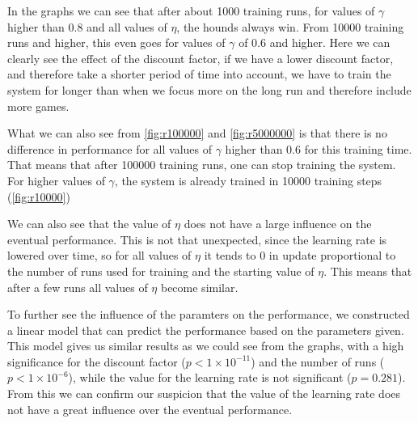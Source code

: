 In the graphs we can see that after about 1000 training runs, for values of
$\gamma$ higher than $0.8$ and all values of $\eta$, the hounds always win.
From 10000 training runs and higher, this even goes for values of $\gamma$
of $0.6$ and higher. Here we can clearly see the effect of the discount
factor, if we have a lower discount factor, and therefore take a shorter
period of time into account, we have to train the system for longer than
when we focus more on the long run and therefore include more games.

What we can also see from \autoref{fig:r100000} and \autoref{fig:r5000000}
is that there is no difference in performance for all values of $\gamma$
higher than $0.6$ for this training time. That means that after 100000
training runs, one can stop training the system. For higher values of
$\gamma$, the system is already trained in 10000 training steps
(\autoref{fig:r10000})

We can also see that the value of $\eta$ does not have a large influence on
the eventual performance. This is not that unexpected, since the learning
rate is lowered over time, so for all values of $\eta$ it tends to 0 in
update proportional to the number of runs used for training and the
starting value of $\eta$. This means that after a few runs all values of
$\eta$ become similar.

To further see the influence of the paramters on the performance, we
constructed a linear model that can predict the performance based on the
parameters given. This model gives us similar results as we could see from
the graphs, with a high significance for the discount factor ($p < 1 \times
10 ^ {-11}$) and the number of runs ($p < 1 \times 10 ^ {-6}$), while the
value for the learning rate is not significant ($p = 0.281$). From this we
can confirm our suspicion that the value of the learning rate does not have a
great influence over the eventual performance.

